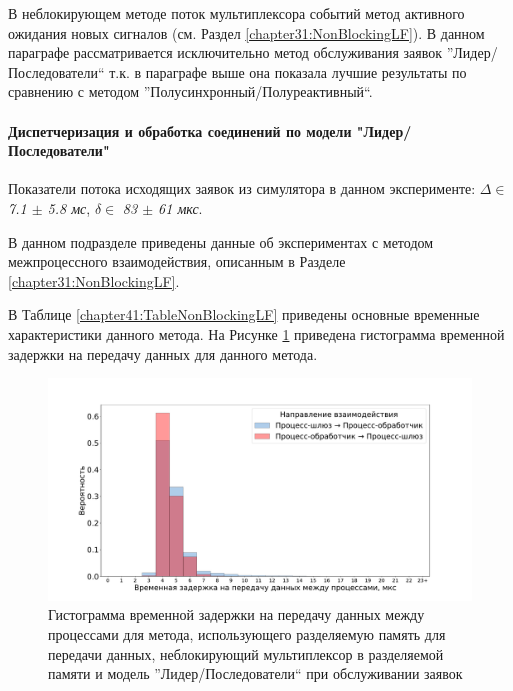 В неблокирующем методе поток мультиплексора событий метод активного ожидания новых сигналов (см. Раздел \ref{chapter31:NonBlockingLF}). В данном параграфе рассматривается исключительно метод обслуживания заявок ''Лидер/Последователи`` т.к. в параграфе выше она показала лучшие результаты по сравнению с методом ''Полусинхронный/Полуреактивный``.

\paragraph{Диспетчеризация и обработка соединений по модели "Лидер/Последователи"}

Показатели потока исходящих заявок из симулятора в данном эксперименте: $\Delta \in$ \textit{7.1 $\pm$ 5.8 мс}, $\delta \in$ \textit{83 $\pm$ 61 мкс}.

В данном подразделе приведены данные об экспериментах с методом межпроцессного взаимодействия, описанным в Разделе \ref{chapter31:NonBlockingLF}.

В Таблице \ref{chapter41:TableNonBlockingLF} приведены основные временные характеристики данного метода. На Рисунке \ref{chapter41:FigNonBlockingLF} приведена гистограмма временной задержки на передачу данных для данного метода.

\begin{figure}[!h]
\caption{Гистограмма временной задержки на передачу данных между процессами для метода, использующего разделяемую память для передачи данных, неблокирующий мультиплексор в разделяемой памяти и модель ''Лидер/Последователи`` при обслуживании заявок}
\label{chapter41:FigNonBlockingLF}
\includegraphics[width=\textwidth]{../../graphics/hist/NonBlockingLF}
\end{figure}

